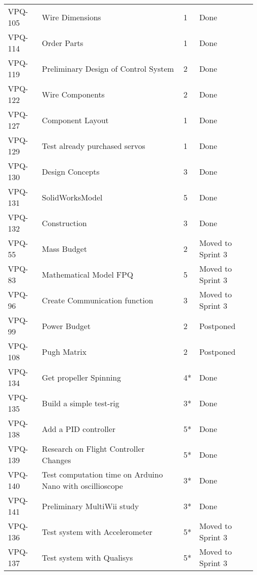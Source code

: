 \begin{table}[ht]
\begin{tabularx}{\linewidth}{|m{1.5cm} m{8.3cm} m{1.5cm} m{3.5cm}|}
\rowcolor{gainsboro} VPQ-105 & Wire Dimensions & 1\centering & Done  \\    
      VPQ-114 & Order Parts & 1\centering & Done  \\
\rowcolor{gainsboro}  VPQ-119 & Preliminary Design of Control System & 2\centering & Done  \\
      VPQ-122 & Wire Components & 2\centering & Done  \\
\rowcolor{gainsboro} VPQ-127 & Component Layout & 1\centering & Done  \\    
      VPQ-129 & Test already purchased servos & 1\centering & Done  \\
\rowcolor{gainsboro}  VPQ-130 & Design Concepts & 3\centering & Done  \\
      VPQ-131 & SolidWorksModel & 5\centering & Done  \\
\rowcolor{gainsboro} VPQ-132 & Construction & 3\centering & Done  \\    
      VPQ-55 & Mass Budget & 2\centering & Moved to Sprint 3  \\
\rowcolor{gainsboro}  VPQ-83 & Mathematical Model FPQ & 5\centering & Moved to Sprint 3  \\
      VPQ-96 & Create Communication function & 3\centering & Moved to Sprint 3  \\
\rowcolor{gainsboro}  VPQ-99 & Power Budget & 2\centering & Postponed  \\
      VPQ-108 & Pugh Matrix & 2\centering & Postponed  \\
\rowcolor{gainsboro}  VPQ-134 & Get propeller Spinning & 4*\centering & Done  \\
      VPQ-135 & Build a simple test-rig & 3*\centering & Done  \\
\rowcolor{gainsboro}  VPQ-138 & Add a PID controller & 5*\centering & Done  \\
      VPQ-139 & Research on Flight Controller Changes & 5*\centering & Done  \\
\rowcolor{gainsboro}  VPQ-140 & Test computation time on Arduino Nano with oscillioscope & 3*\centering & Done  \\
      VPQ-141 & Preliminary MultiWii study & 3*\centering & Done  \\
\rowcolor{gainsboro}  VPQ-136 & Test system with Accelerometer & 5*\centering & Moved to Sprint 3  \\
      VPQ-137 & Test system with Qualisys & 5*\centering & Moved to Sprint 3  \\
\hline    
\end{tabularx}
\end{table}
\clearpage

